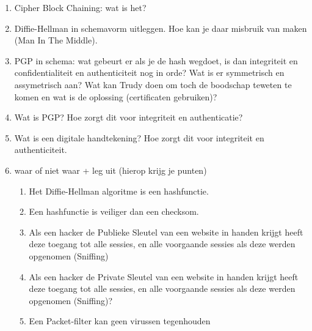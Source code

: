 \begin{enumerate}
\enumeratext{}

\item	Cipher Block Chaining: wat is het?

\enumeratext{}

\item	Diffie-Hellman in schemavorm uitleggen. Hoe kan je daar misbruik van maken (Man In The Middle).

\enumeratext{}

\item	PGP in schema: wat gebeurt er als je de hash wegdoet, is dan integriteit en confidentialiteit en authenticiteit nog in orde? Wat is er symmetrisch en assymetrisch aan? Wat kan Trudy doen om toch de boodschap teweten te komen en wat is de oplossing (certificaten gebruiken)?

\enumeratext{}

\item	Wat is PGP? Hoe zorgt dit voor integriteit en authenticatie?

\enumeratext{}

\item	Wat is een digitale handtekening? Hoe zorgt dit voor integriteit en authenticiteit.

\enumeratext{}

\clearpage

\item	waar of niet waar + leg uit (hierop krijg je punten)
    \begin{enumerate} %
        \item	Het Diffie-Hellman algoritme is een hashfunctie.

\enumeratext{}

        \item	Een hashfunctie is veiliger dan een checksom.

\enumeratext{}

        \item	Als een hacker de Publieke Sleutel van een website in handen krijgt heeft deze toegang tot alle sessies, en alle voorgaande sessies als deze werden opgenomen (Sniffing)

\enumeratext{}

        \item	Als een hacker de Private Sleutel van een website in handen krijgt heeft deze toegang tot alle sessies, en alle voorgaande sessies als deze werden opgenomen (Sniffing)?

\enumeratext{}

        \item	Een Packet-filter kan geen virussen tegenhouden


\end{enumerate}
\end{enumerate}
